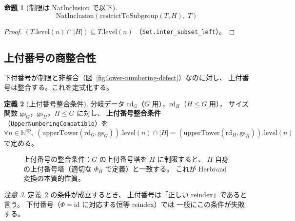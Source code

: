 \documentclass[a4paper,11pt]{ltjsarticle}
\theoremstyle{definition}
\newtheorem{definition}{定義}[section]
\theoremstyle{plain}
\newtheorem{proposition}[definition]{命題}
\theoremstyle{remark}
\newtheorem{remark}[definition]{注意}
\newcommand{\Phi}{\varPhi}
\begin{document}
\begin{proposition}[制限は NatInclusion で以下]\label{prop:restrict-nat-inclusion}
  \[
    \mathrm{NatInclusion}(\mathrm{restrictToSubgroup}(T,H),\;T)
  \]
\end{proposition}

\begin{proof}
  $(T.\mathrm{level}(n) \cap \lvert H\rvert) \subseteq T.\mathrm{level}(n)$
  （\texttt{Set.inter\_subset\_left}）。
\end{proof}

\subsection{上付番号の商整合性}

下付番号が制限と非整合（図~\ref{fig:lower-numbering-defect}）なのに対し、
上付番号は整合する。これを定式化する。

\begin{definition}[上付番号整合条件]\label{def:upper-numbering-compatible}
  分岐データ $\mathrm{rd}_G$（$G$ 用），$\mathrm{rd}_H$（$H \leq G$ 用），
  サイズ関数 $\mathrm{gs}_G$，$\mathrm{gs}_H$，$H \leq G$ に対し、
  \textbf{上付番号整合条件}（\texttt{UpperNumberingCompatible}）を
  \[
    \forall n \in \mathbb{N}^{\mathrm{op}},\;
    (\mathrm{upperTower}(\mathrm{rd}_G,\mathrm{gs}_G)).\mathrm{level}(n) \cap \lvert H\rvert
    = (\mathrm{upperTower}(\mathrm{rd}_H,\mathrm{gs}_H)).\mathrm{level}(n)
  \]
  で定める。
\end{definition}

\begin{figure}[H]
\centering
{}
\caption{上付番号の整合条件：$G$ の上付番号塔を $H$ に制限すると、
$H$ 自身の上付番号塔（適切な $\Phi_H$ で定義）と一致する。
これが Herbrand 変換の本質的性質。}
\label{fig:upper-compatibility}
\end{figure}

\begin{remark}
  定義~\ref{def:upper-numbering-compatible} の条件が成立するとき、
  上付番号は「正しい reindex」であると言う。
  下付番号（$\Phi = \mathrm{id}$ に対応する恒等 reindex）では
  一般にこの条件が失敗する。
\end{remark}
\end{document}

